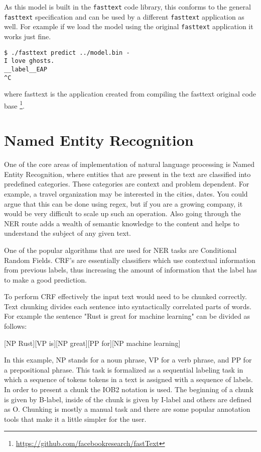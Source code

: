 \documentclass{book}
\begin{document}
As this model is built in the \lstinline{fasttext} code library, this conforms to the general \lstinline{fasttext} specification and can be used by a different \lstinline{fasttext} application as well. For example if we load the model using the original \lstinline{fasttext} application it works just fine.

\begin{lstlisting}[caption={},basicstyle=\small]
$ ./fasttext predict ../model.bin -
I love ghosts.
__label__EAP
^C
\end{lstlisting}

where fasttext is the application created from compiling the fasttext original code base \footnote{\href{}{https://github.com/facebookresearch/fastText}}.

\label{sec:Sentence Classification}

\section{Named Entity Recognition}%
One of the core areas of implementation of natural language processing is Named Entity Recognition, where entities that are present in the text are classified into predefined categories. These categories are context and problem dependent. For example, a travel organization may be interested in the cities, dates. You could argue that this can be done using regex, but if you are a growing company, it would be very difficult to scale up such an operation. Also going through the NER route adds a wealth of semantic knowledge to the content and helps to understand the subject of any given text.

One of the popular algorithms that are used for NER tasks are Conditional Random Fields. CRF's are essentially classifiers which use contextual information from previous labels, thus increasing the amount of information that the label has to make a good prediction.

To perform CRF effectively the input text would need to be chunked correctly. Text chunking divides each sentence into syntactically correlated parts of words. For example the sentence "Rust is great for machine learning" can be divided as follows:

[NP Rust][VP is][NP great][PP for][NP machine learning]

In this example, NP stands for a noun phrase, VP for a verb phrase, and PP for a prepositional phrase. This task is formalized as a sequential labeling task in which a sequence of tokens tokens in a text is assigned with a sequence of labels. In order to present a chunk the IOB2 notation is used. The beginning of a chunk is given by B-label, inside of the chunk is given by I-label and others are defined as O. Chunking is mostly a manual task and there are some popular annotation tools that make it a little simpler for the user.
\end{document}
